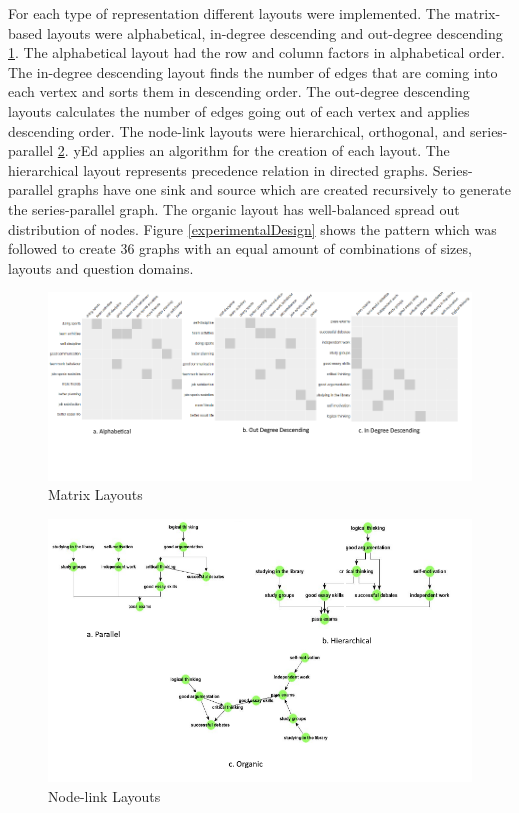 \documentclass{l4proj}
\begin{document}
For each type of representation different layouts were implemented. The matrix-based layouts were alphabetical, in-degree descending and out-degree descending \ref{matrixLayout}. The alphabetical layout had the row and column factors in alphabetical order. The in-degree descending layout finds the number of edges that are coming into each vertex and sorts them in descending order. The out-degree descending layouts calculates the number of edges going out of each vertex and applies descending order.  The node-link layouts were hierarchical, orthogonal, and series-parallel \ref{nodeLayouts}. yEd applies an algorithm for the creation of each layout. The hierarchical layout represents precedence relation in directed graphs. Series-parallel graphs have one sink and source which are created recursively to generate the series-parallel graph. The organic layout has well-balanced spread out distribution of nodes. Figure \ref{experimentalDesign} shows the pattern which was followed to create 36 graphs with an equal amount of combinations of sizes, layouts and question domains. 

\begin{figure}[h]
\centering
\includegraphics[width=18cm]{images/matrixLayout.png}
\caption{Matrix Layouts}
\label{matrixLayout}
\end{figure}

\begin{figure}[h]
\centering
\includegraphics[width=15cm]{images/nodeLayouts.png}
\caption{Node-link Layouts}
\label{nodeLayouts}
\end{figure}
\end{document}
